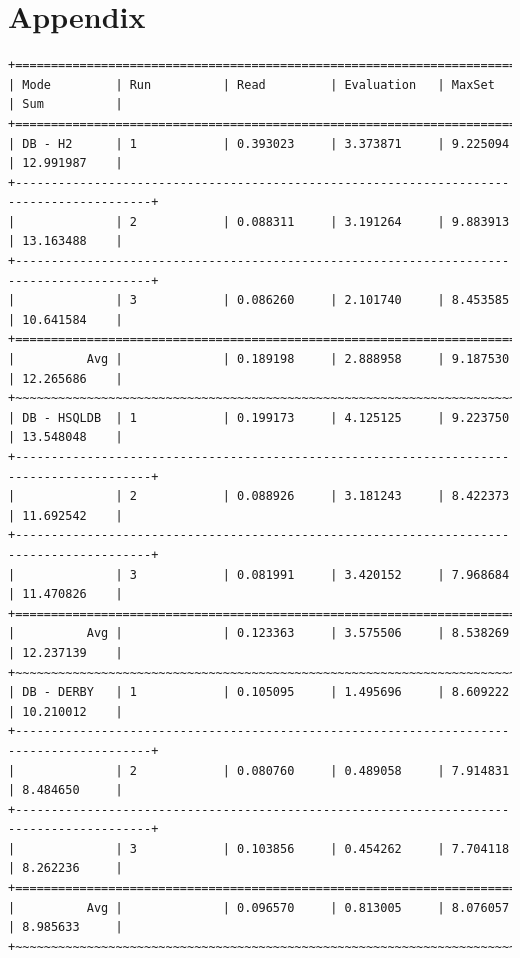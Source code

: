 \documentclass[draft,final]{vutinfth} %
\begin{document}
 




\chapter*{Appendix}

\begin{lstlisting}[basicstyle=\tiny,caption={Benchmark DB \textbf{ohne} Indizes, Datei: lubm-ex-20-15.sparql.xml},label={lst:dboi15}]
+=========================================================================================+
| Mode         | Run          | Read         | Evaluation   | MaxSet       | Sum          | 
+=========================================================================================+
| DB - H2      | 1            | 0.393023     | 3.373871     | 9.225094     | 12.991987    | 
+-----------------------------------------------------------------------------------------+
|              | 2            | 0.088311     | 3.191264     | 9.883913     | 13.163488    | 
+-----------------------------------------------------------------------------------------+
|              | 3            | 0.086260     | 2.101740     | 8.453585     | 10.641584    | 
+=========================================================================================+
|          Avg |              | 0.189198     | 2.888958     | 9.187530     | 12.265686    | 
+~~~~~~~~~~~~~~~~~~~~~~~~~~~~~~~~~~~~~~~~~~~~~~~~~~~~~~~~~~~~~~~~~~~~~~~~~~~~~~~~~~~~~~~~~+
| DB - HSQLDB  | 1            | 0.199173     | 4.125125     | 9.223750     | 13.548048    | 
+-----------------------------------------------------------------------------------------+
|              | 2            | 0.088926     | 3.181243     | 8.422373     | 11.692542    | 
+-----------------------------------------------------------------------------------------+
|              | 3            | 0.081991     | 3.420152     | 7.968684     | 11.470826    | 
+=========================================================================================+
|          Avg |              | 0.123363     | 3.575506     | 8.538269     | 12.237139    | 
+~~~~~~~~~~~~~~~~~~~~~~~~~~~~~~~~~~~~~~~~~~~~~~~~~~~~~~~~~~~~~~~~~~~~~~~~~~~~~~~~~~~~~~~~~+
| DB - DERBY   | 1            | 0.105095     | 1.495696     | 8.609222     | 10.210012    | 
+-----------------------------------------------------------------------------------------+
|              | 2            | 0.080760     | 0.489058     | 7.914831     | 8.484650     | 
+-----------------------------------------------------------------------------------------+
|              | 3            | 0.103856     | 0.454262     | 7.704118     | 8.262236     | 
+=========================================================================================+
|          Avg |              | 0.096570     | 0.813005     | 8.076057     | 8.985633     | 
+~~~~~~~~~~~~~~~~~~~~~~~~~~~~~~~~~~~~~~~~~~~~~~~~~~~~~~~~~~~~~~~~~~~~~~~~~~~~~~~~~~~~~~~~~+

\end{lstlisting}
\end{document}
